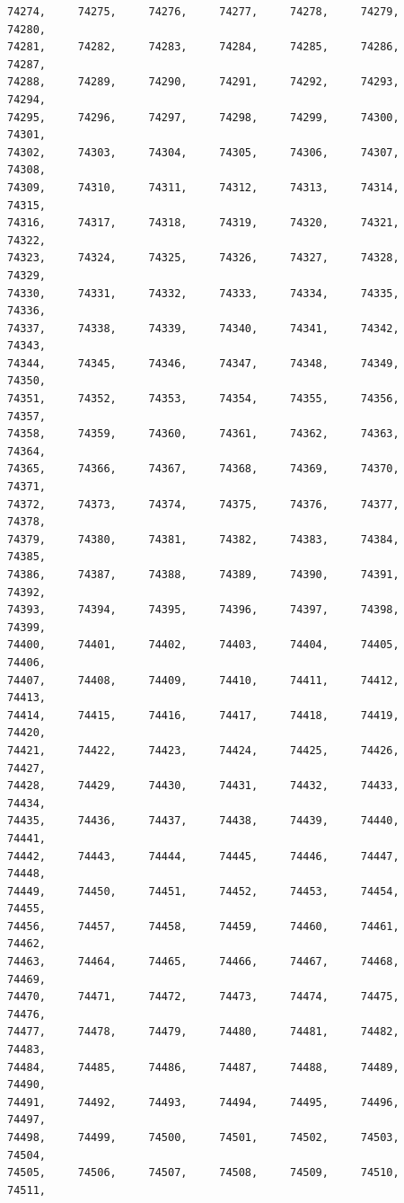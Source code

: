 \documentclass[a4paper,11pt]{report}
\begin{document}
\begin{verbatim}
74274,     74275,     74276,     74277,     74278,     74279,     74280,     
74281,     74282,     74283,     74284,     74285,     74286,     74287,     
74288,     74289,     74290,     74291,     74292,     74293,     74294,     
74295,     74296,     74297,     74298,     74299,     74300,     74301,     
74302,     74303,     74304,     74305,     74306,     74307,     74308,     
74309,     74310,     74311,     74312,     74313,     74314,     74315,     
74316,     74317,     74318,     74319,     74320,     74321,     74322,     
74323,     74324,     74325,     74326,     74327,     74328,     74329,     
74330,     74331,     74332,     74333,     74334,     74335,     74336,     
74337,     74338,     74339,     74340,     74341,     74342,     74343,     
74344,     74345,     74346,     74347,     74348,     74349,     74350,     
74351,     74352,     74353,     74354,     74355,     74356,     74357,     
74358,     74359,     74360,     74361,     74362,     74363,     74364,     
74365,     74366,     74367,     74368,     74369,     74370,     74371,     
74372,     74373,     74374,     74375,     74376,     74377,     74378,     
74379,     74380,     74381,     74382,     74383,     74384,     74385,     
74386,     74387,     74388,     74389,     74390,     74391,     74392,     
74393,     74394,     74395,     74396,     74397,     74398,     74399,     
74400,     74401,     74402,     74403,     74404,     74405,     74406,     
74407,     74408,     74409,     74410,     74411,     74412,     74413,     
74414,     74415,     74416,     74417,     74418,     74419,     74420,     
74421,     74422,     74423,     74424,     74425,     74426,     74427,     
74428,     74429,     74430,     74431,     74432,     74433,     74434,     
74435,     74436,     74437,     74438,     74439,     74440,     74441,     
74442,     74443,     74444,     74445,     74446,     74447,     74448,     
74449,     74450,     74451,     74452,     74453,     74454,     74455,     
74456,     74457,     74458,     74459,     74460,     74461,     74462,     
74463,     74464,     74465,     74466,     74467,     74468,     74469,     
74470,     74471,     74472,     74473,     74474,     74475,     74476,     
74477,     74478,     74479,     74480,     74481,     74482,     74483,     
74484,     74485,     74486,     74487,     74488,     74489,     74490,     
74491,     74492,     74493,     74494,     74495,     74496,     74497,     
74498,     74499,     74500,     74501,     74502,     74503,     74504,     
74505,     74506,     74507,     74508,     74509,     74510,     74511,     

\end{verbatim}
\end{document}
